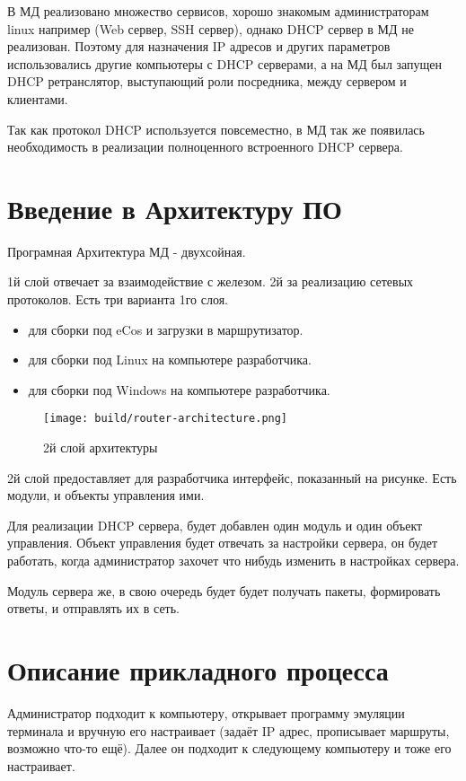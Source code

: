 \documentclass[14pt,a4paper]{extarticle}
\begin{document}
В МД реализовано множество сервисов, хорошо знакомым администраторам linux например (Web сервер, SSH сервер), однако DHCP сервер в МД не реализован. Поэтому для назначения IP адресов и других параметров использовались другие компьютеры с DHCP серверами, а на МД был запущен DHCP ретранслятор, выступающий роли посредника, между сервером и клиентами.

Так как протокол DHCP используется повсеместно, в МД так же появилась необходимость в реализации полноценного встроенного DHCP сервера.

\pagebreak
\section{Введение в Архитектуру ПО}

Програмная Архитектура МД - двухсойная.

1й слой отвечает за взаимодействие с железом. 2й за реализацию сетевых протоколов.
Есть три варианта 1го слоя. \cite{md-docs}

\begin{itemize}
    \item для сборки под eCos и загрузки в маршрутизатор.
    \item для сборки под Linux на компьютере разработчика.
    \item для сборки под Windows на компьютере разработчика.
\end{itemize}

\begin{figure}[H]
    \texttt{[image: build/router-architecture.png]}
    \caption{2й слой архитектуры}
\end{figure}

2й слой предоставляет для разработчика интерфейс, показанный на рисунке.
Есть модули, и объекты управления ими. \cite{md-docs}

Для реализации DHCP сервера, будет добавлен один модуль и один объект управления.
Объект управления будет отвечать за настройки сервера, он будет работать, когда администратор захочет что нибудь изменить в настройках сервера.

Модуль сервера же, в свою очередь будет будет получать пакеты, формировать ответы, и отправлять их в сеть.

\section{Описание прикладного процесса}

Администратор подходит к компьютеру, открывает программу эмуляции терминала и вручную его настраивает
(задаёт IP адрес, прописывает маршруты, возможно что-то ещё).
Далее он подходит к следующему компьютеру и тоже его настраивает.
\end{document}
